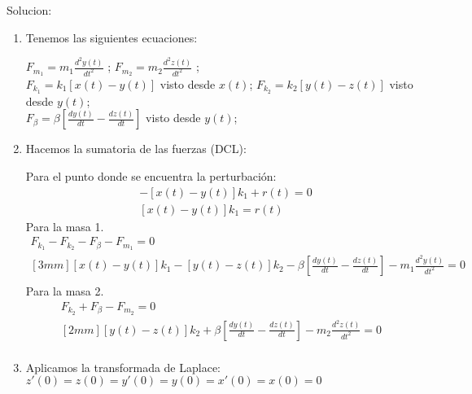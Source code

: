 \documentclass[12pt]{article}
\begin{document}
Solucion:
\begin{enumerate}
  \item Tenemos las siguientes ecuaciones:

    \(\displaystyle F_{m_{1}}=m_{1}\frac{d^{2}y(t)}{dt^{2}}\) ; 
    \(\displaystyle F_{m_{2}}=m_{2}\frac{d^{2}z(t)}{dt^{2}}\) ;\\

    \(\displaystyle F_{k_{1}}=k_{1}[x(t)-y(t)]\) visto desde $x(t)$; \vspace{5mm}
    \(\displaystyle F_{k_{2}}=k_{2}[y(t)-z(t)]\) visto desde $y(t)$;\\

    \(\displaystyle F_{\beta}=\beta\left[\frac{dy(t)}{dt}-\frac{dz(t)}{dt}\right]\) visto desde $y(t)$;\\

  \item Hacemos la sumatoria de las fuerzas (DCL):

    Para el punto donde se encuentra la perturbaci\'on:
    \begin{eqnarray*}
      & -[x(t)-y(t)]k_{1}+r(t)=0\\
      & [x(t)-y(t)]k_{1}=r(t)
    \end{eqnarray*}
    Para la masa 1.
    \begin{eqnarray*}
      F_{k_{1}} - F_{k_{2}} - F_{\beta} - F_{m_{1}} = 0 \\ [3mm]
      [x(t)-y(t)]k_{1} - [y(t)-z(t)]k_{2} - \beta\left[\frac{dy(t)}{dt}-\frac{dz(t)}{dt}\right] - m_{1}\frac{d^{2}y(t)}{dt^{2}} = 0 \\[3mm]
    \end{eqnarray*}
    Para la masa 2.
    \begin{eqnarray*}
      F_{k_{2}} + F_{\beta} - F_{m_{2}} = 0 \\ [2mm]
      [y(t)-z(t)]k_{2} + \beta\left[\frac{dy(t)}{dt}-\frac{dz(t)}{dt} \right] - m_{2}\frac{d^{2}z(t)}{dt^{2}} = 0 \\[2mm]
    \end{eqnarray*}

  \item Aplicamos la transformada de Laplace: \(\displaystyle z'(0)=z(0)=y'(0)=y(0)=x'(0)=x(0)=0\)


\end{enumerate}
\end{document}

